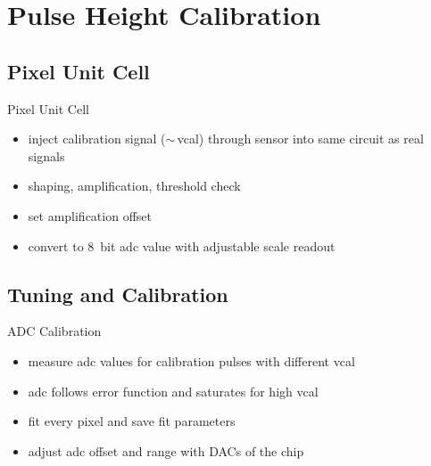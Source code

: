 \section{Pulse Height Calibration}
\subsection{Pixel Unit Cell}
\begin{frame}{Pixel Unit Cell}

	
	\begin{itemize}\itemfill
		\item inject calibration signal ($\sim$\,vcal) through sensor into same circuit as real signals
		\item shaping, amplification, threshold check
		\item set amplification offset
		\item convert to \SI{8}{bit} adc value with adjustable scale \ra readout
	\end{itemize}
	
\end{frame}

\subsection{Tuning and Calibration}
\begin{frame}{ADC Calibration}
	
	
	\vspace*{-10pt}

	\begin{itemize}\itemfill 
		\item<1-> measure adc values for calibration pulses with different vcal
		\item<1-> adc follows error function and saturates for high vcal
		\item<2> fit every pixel and save fit parameters
		\item<2> adjust adc offset and range with DACs of the chip
	\end{itemize}

\end{frame}


